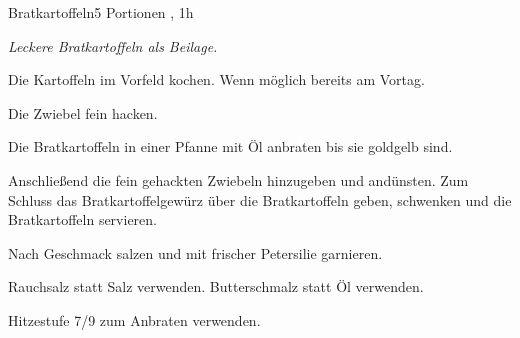 \documentclass[../recipe-collections/cooking.tex]{subfiles}
\begin{document}
\begin{recipe}{Bratkartoffeln}{5 Portionen }{, 1h }

  \freeform{}\textit{Leckere Bratkartoffeln als Beilage.}


  Die Kartoffeln im Vorfeld kochen.
  Wenn möglich bereits am Vortag.


  Die Zwiebel fein hacken.


  Die Bratkartoffeln in einer Pfanne mit Öl anbraten bis sie goldgelb sind.


  Anschließend die fein gehackten Zwiebeln hinzugeben und andünsten.
  Zum Schluss das Bratkartoffelgewürz über die Bratkartoffeln geben, schwenken und die Bratkartoffeln servieren.


  Nach Geschmack salzen und mit frischer Petersilie garnieren.

  \freeform{}\hrulefill{}

  \freeform{}
  Rauchsalz statt Salz verwenden.
  Butterschmalz statt Öl verwenden.

  \freeform{}
  Hitzestufe 7/9 zum Anbraten verwenden.

\end{recipe}
\end{document}
